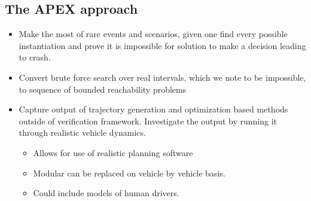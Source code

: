  \subsection{The APEX approach}
 \begin{itemize}
 	\item Make the most of rare events and scenarios, given one find every possible instantiation and prove it is impossible for solution to make a decision leading to crash.
 	\item Convert brute force search over real intervals, which we note to be impossible, to sequence of bounded reachability problems \cite{gao2013satisfiability}
 	\item Capture output of trajectory generation and optimization based methods outside of verification framework. Investigate the output by running it through realistic vehicle dynamics.
	 	\begin{itemize}
	 		\item Allows for use of realistic planning software
	 		\item Modular can be replaced on vehicle by vehicle basis. 
	 		\item Could include models of human drivers. 
	 	\end{itemize}
 \end{itemize}
 
